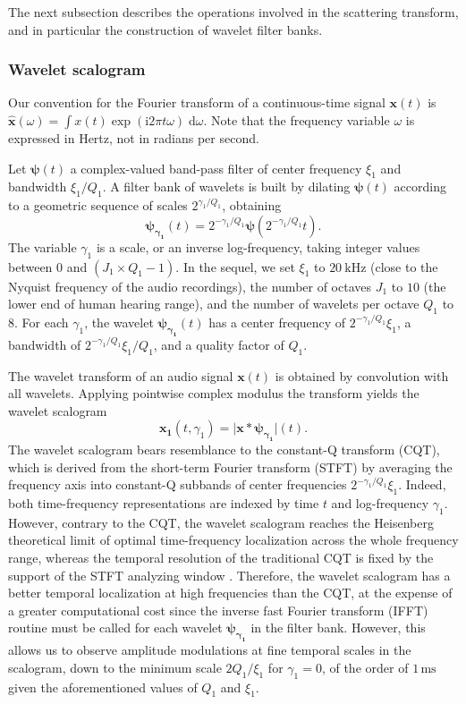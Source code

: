 The next subsection describes the operations involved in the scattering transform, and in particular the construction of wavelet filter banks.

\subsubsection{Wavelet scalogram}
Our convention for the Fourier transform of a continuous-time signal $\boldsymbol{x}(t)$ is $\boldsymbol{\hat{x}}(\omega) = \int x(t) \exp(\mathrm{i} 2\pi t \omega) \; \mathrm{d}\omega$. Note that the frequency variable $\omega$ is expressed in Hertz, not in radians per second.

Let $\boldsymbol{\psi}(t)$ a complex-valued band-pass filter of
center frequency $\xi_1$ and bandwidth $\xi_1/Q_1$.
A filter bank of wavelets is built by dilating $\boldsymbol{\psi}(t)$
according to a geometric sequence of scales $2^{\gamma_1/Q_1}$, obtaining
\begin{equation}
\boldsymbol{\psi_{\gamma_1}}(t) = 2^{-\gamma_1/Q_1} \boldsymbol{\psi}(2^{-\gamma_1/Q_1} t)\mbox{.}
\end{equation}
The variable $\gamma_1$ is a scale, or an inverse log-frequency, taking integer values between $0$ and $(J_1 \times Q_1 - 1)$.
In the sequel, we set $\xi_1$ to $20~\mathrm{kHz}$ (close to the Nyquist frequency of the audio recordings), the number of octaves $J_1$ to $10$ (the lower end of human hearing range), and the number of wavelets per octave $Q_1$ to $8$.
For each $\gamma_1$, the wavelet $\boldsymbol{\psi_{\gamma_1}}(t)$
has a center frequency of $2^{-\gamma_1/Q_1}\xi_1$, a bandwidth of $2^{-\gamma_1/Q_1}\xi_1/Q_1$, and a quality factor of $Q_1$.

The wavelet transform of an audio signal
$\boldsymbol{x}(t)$ is obtained by convolution with all wavelets.
Applying pointwise complex modulus the transform yields
the wavelet scalogram
\begin{equation}
\boldsymbol{x_1}(t, \gamma_1)
= \vert \boldsymbol{x} \ast \boldsymbol{\psi_{\gamma_1}} \vert (t)\mbox{.}
\end{equation}
The wavelet scalogram bears resemblance to the constant-Q transform (CQT),
which is derived from the short-term Fourier transform (STFT) by averaging the frequency
axis into constant-Q subbands of center frequencies $2^{-\gamma_1/Q_1}\xi_1$.
Indeed, both time-frequency representations are indexed by time $t$ and log-frequency $\gamma_1$.
However, contrary to the CQT, the wavelet scalogram reaches the Heisenberg
theoretical limit of optimal time-frequency localization across the whole
frequency range, whereas the temporal resolution of the traditional CQT is fixed by the support of the STFT analyzing window \cite{Brown1992}.
Therefore, the wavelet scalogram has a better temporal localization at high
frequencies than the CQT, at the expense of a greater computational cost
since the inverse fast Fourier transform (IFFT) routine must be called for each wavelet $\boldsymbol{\psi_{\gamma_1}}$ in the filter bank.
However, this allows us to observe amplitude modulations at fine temporal scales in the scalogram, down to the minimum scale $2Q_1/\xi_1$ for $\gamma_1 = 0$, of the order of $1\,\textrm{ms}$ given the aforementioned values of $Q_1$ and $\xi_1$.

